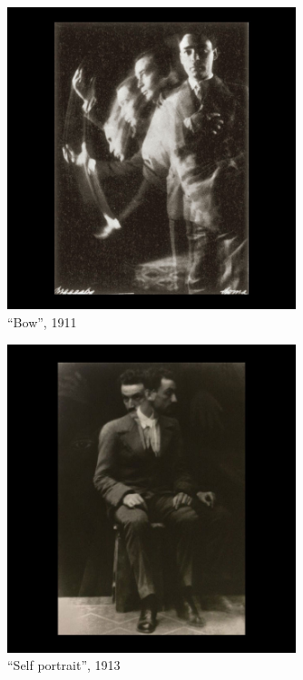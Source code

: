 \documentclass[
  french,
]{book}
\begin{document}
\begin{figure}
\centering
\includegraphics[width=0.75\textwidth,height=\textheight]{medias/corpus/bragaglia/Anton-Giulio-Bragaglia-fotodinamica-05.jpg}
\caption{``Bow'', 1911}
\end{figure}

\begin{figure}
\centering
\includegraphics[width=0.75\textwidth,height=\textheight]{medias/corpus/bragaglia/Anton-Giulio-Bragaglia-fotodinamica-06.jpg}
\caption{``Self portrait'', 1913}
\end{figure}
\end{document}
